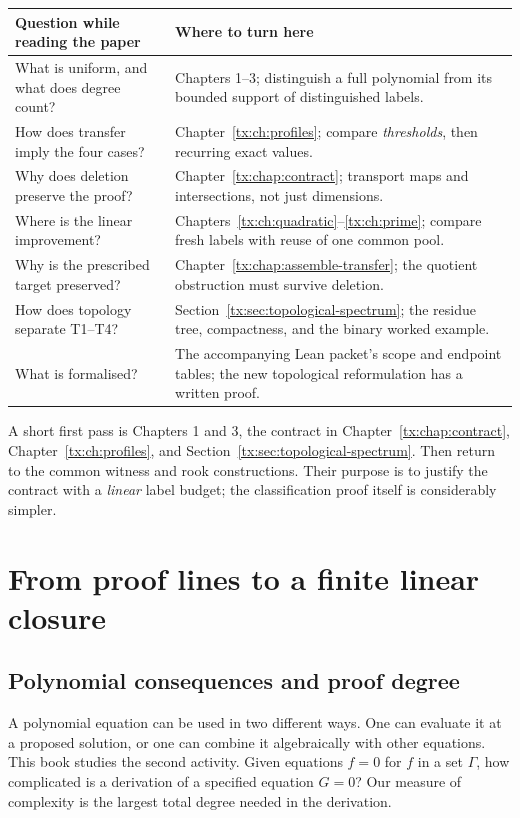 \documentclass[11pt,a4paper,oneside,openany]{book}
\theoremstyle{definition}\newtheorem{definition}[theorem]{Definition}
\theoremstyle{remark}\newtheorem{remark}[theorem]{Remark}
\numberwithin{equation}{chapter}
\begin{document}
\begin{center}\small
\begin{tabular}{@{}>{\raggedright\arraybackslash}p{}>{\raggedright\arraybackslash}p{}@{}}
\toprule
Question while reading the paper & Where to turn here\\
\midrule
What is uniform, and what does degree count? & Chapters 1--3; distinguish a full polynomial from its bounded support of distinguished labels.\\[3pt]
How does transfer imply the four cases? & Chapter~\ref{tx:ch:profiles}; compare \emph{thresholds}, then recurring exact values.\\[3pt]
Why does deletion preserve the proof? & Chapter~\ref{tx:chap:contract}; transport maps and intersections, not just dimensions.\\[3pt]
Where is the linear improvement? & Chapters~\ref{tx:ch:quadratic}--\ref{tx:ch:prime}; compare fresh labels with reuse of one common pool.\\[3pt]
Why is the prescribed target preserved? & Chapter~\ref{tx:chap:assemble-transfer}; the quotient obstruction must survive deletion.\\[3pt]
How does topology separate T1--T4? & Section~\ref{tx:sec:topological-spectrum}; the residue tree, compactness, and the binary worked example.\\[3pt]
What is formalised? & The accompanying Lean packet's scope and endpoint tables; the new topological reformulation has a written proof.\\
\bottomrule
\end{tabular}\end{center}

A short first pass is Chapters 1 and 3, the contract in
Chapter~\ref{tx:chap:contract}, Chapter~\ref{tx:ch:profiles}, and
Section~\ref{tx:sec:topological-spectrum}. Then return to the common
witness and rook constructions. Their purpose is to justify the
contract with a \emph{linear} label budget; the classification proof
itself is considerably simpler.

\tableofcontents
\mainmatter

\part{From proof lines to a finite linear closure}

\chapter{Polynomial consequences and proof degree}\label{tx:ch:consequences}
A polynomial equation can be used in two different ways. One can evaluate
it at a proposed solution, or one can combine it algebraically with other
equations. This book studies the second activity. Given equations
$f=0$ for $f$ in a set $\Gamma$, how complicated is a derivation of a
specified equation $G=0$? Our measure of complexity is the largest total
degree needed in the derivation.
\end{document}
